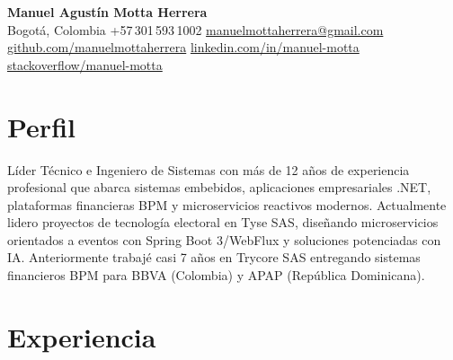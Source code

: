 \documentclass[11pt,a4paper]{article}
\begin{document}
\begin{center}
    {\LARGE\bfseries\color{darktext} Manuel Agust\'{i}n Motta Herrera} \\[8pt]
    {\color{lighttext}
        \faMapMarker*\enspace Bogot\'{a}, Colombia \quad\textbar\quad
        \faPhone*\enspace +57\,301\,593\,1002 \quad\textbar\quad
        \faEnvelope\enspace \href{mailto:manuelmottaherrera@gmail.com}{manuelmottaherrera@gmail.com}
    } \\[4pt]
    {\color{lighttext}
        \faGithub\enspace \href{https://github.com/manuelmottaherrera}{github.com/manuelmottaherrera} \quad\textbar\quad
        \faLinkedin\enspace \href{https://www.linkedin.com/in/manuel-motta-65b84a1a7}{linkedin.com/in/manuel-motta} \quad\textbar\quad
        \faStackOverflow\enspace \href{https://stackoverflow.com/users/13502779}{stackoverflow/manuel-motta}
    }
\end{center}

\vspace{-2pt}

\section{Perfil}

L\'{i}der T\'{e}cnico e Ingeniero de Sistemas con m\'{a}s de 12 a\~{n}os de experiencia profesional que abarca sistemas embebidos, aplicaciones empresariales .NET, plataformas financieras BPM y microservicios reactivos modernos. Actualmente lidero proyectos de tecnolog\'{i}a electoral en Tyse SAS, dise\~{n}ando microservicios orientados a eventos con Spring Boot 3/WebFlux y soluciones potenciadas con IA. Anteriormente trabaj\'{e} casi 7 a\~{n}os en Trycore SAS entregando sistemas financieros BPM para BBVA (Colombia) y APAP (Rep\'{u}blica Dominicana).

\section{Experiencia}
\end{document}
